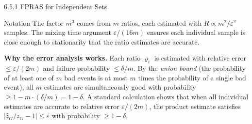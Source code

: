 \documentclass[aspectratio=169,10pt]{beamer}
\begin{document}
\begin{frame}[allowframebreaks]{6.5.1 FPRAS for Independent Sets}
\begin{block}{Notation}
The factor $m^3$ comes from $m$ ratios, each estimated with $R \propto m^2/\varepsilon^2$ samples.
The mixing time argument $\varepsilon/(16m)$ ensures each individual sample is close enough to stationarity that the ratio estimates are accurate.
\end{block}

\textbf{Why the error analysis works.}
Each ratio $\varrho_i$ is estimated with relative error $\le \varepsilon/(2m)$ and failure probability $\le \delta/m$.
By the \emph{union bound} (the probability of at least one of $m$ bad events is at most $m$ times the probability of a single bad event), all $m$ estimates are simultaneously good with probability $\ge 1 - m \cdot (\delta/m) = 1 - \delta$.
A standard calculation shows that when all individual estimates are accurate to relative error $\varepsilon/(2m)$, the product estimate satisfies $|\hat{z}_G/z_G - 1| \le \varepsilon$ with probability $\ge 1-\delta$.

\end{frame}
\end{document}
